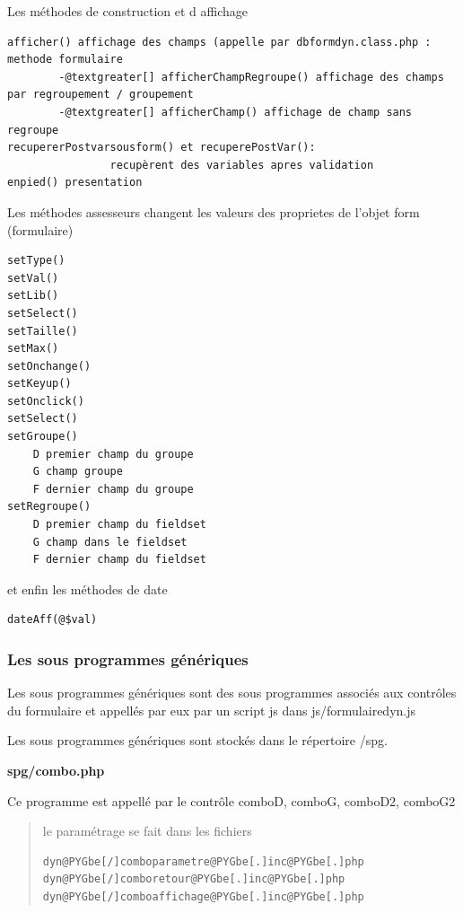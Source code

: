 \documentclass[letterpaper,10pt,french]{manual}
\begin{document}
Les  méthodes de construction et d affichage

\begin{Verbatim}[commandchars=@\[\]]
afficher() affichage des champs (appelle par dbformdyn.class.php : methode formulaire
        -@textgreater[] afficherChampRegroupe() affichage des champs par regroupement / groupement
        -@textgreater[] afficherChamp() affichage de champ sans regroupe
recupererPostvarsousform() et recuperePostVar():
                recupèrent des variables apres validation
enpied() presentation
\end{Verbatim}

Les méthodes assesseurs changent les valeurs des proprietes de l'objet form (formulaire)

\begin{Verbatim}[commandchars=@\[\]]
setType()
setVal()
setLib()
setSelect()
setTaille()
setMax()
setOnchange()
setKeyup()
setOnclick()
setSelect()
setGroupe()
    D premier champ du groupe
    G champ groupe
    F dernier champ du groupe
setRegroupe()
    D premier champ du fieldset
    G champ dans le fieldset
    F dernier champ du fieldset
\end{Verbatim}

et enfin les méthodes de date

\begin{Verbatim}[commandchars=@\[\]]
dateAff(@$val)
\end{Verbatim}


\subsubsection{Les sous programmes génériques}

Les sous programmes génériques sont des sous programmes associés aux contrôles
du formulaire et appellés par eux par un script js dans js/formulairedyn.js

Les sous programmes génériques sont stockés dans le répertoire /spg.

\textbf{spg/combo.php}

Ce programme est appellé par le contrôle comboD, comboG, comboD2, comboG2
\begin{quote}

le paramétrage se fait dans les fichiers

\begin{Verbatim}[commandchars=@\[\]]
dyn@PYGbe[/]comboparametre@PYGbe[.]inc@PYGbe[.]php
dyn@PYGbe[/]comboretour@PYGbe[.]inc@PYGbe[.]php
dyn@PYGbe[/]comboaffichage@PYGbe[.]inc@PYGbe[.]php
\end{Verbatim}
\end{quote}
\end{document}
